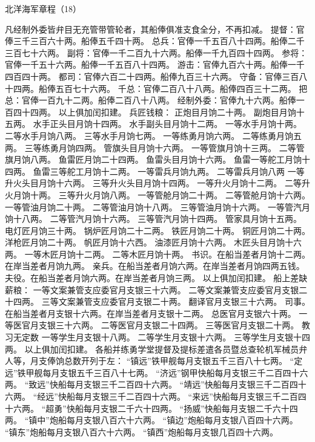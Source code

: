 \documentclass[12pt,UTF8]{ctexbook}
\begin{document}
北洋海军章程（18）

凡经制外委皆弁目无充管带管轮者，其船俸俱准支食全分，不再扣减。
提督：官俸三千三百六十两。船俸五千四十两。
总兵：官俸一千五百八十四两。船俸二千三百七十六两。
副将：官俸一千二百九十六两。船俸一千九百四十四两。
参将：官俸一千五十六两。船俸一千五百八十四两。
游击：官俸九百六十两。船俸一千四百四十两。
都司：官俸六百二十四两。船俸九百三十六两。
守备：官俸三百八十四两。船俸五百七十六两。
千总：官俸二百八十八两。船俸四百三十二两。
把总：官俸一百九十二两。船俸二百八十八两。
经制外委：官俸九十六两。船俸一百四十四两。
以上俱加闰扣建。
兵匠钱粮：
正炮目月饷二十两。
副炮目月饷十五两。
水手正头目月饷十四两。
水手副头目月饷十二两。
一等水手月饷十两。
二等水手月饷八两。
三等水手月饷七两。
一等练勇月饷六两。
二等练勇月饷五两。
三等练勇月饷四两。
管旗头目月饷十六两。
一等管旗月饷十三两。
二等管旗月饷八两。
鱼雷匠月饷二十四两。
鱼雷头目月饷十六两。
鱼雷一等舵工月饷十四两。
鱼雷三等舵工月饷十二两。
一等雷兵月饷九两。
二等雷兵月饷八两
一等升火头目月饷十六两。
三等升火头目月饷十四两。
一等升火月饷十二两。
二等升火月饷十两。
三等升火月饷八两。
一等管舱月饷二十两。
二等管舱月饷十六两。
一等管油月饷二十两。
二等管油月饷十八两。
三等管油月饷十六两。
一等管汽月饷十八两。
二等管汽月饷十六两。
三等管汽月饷十四两。
管家具月饷十五两。
电灯匠月饷三十两。
锅炉匠月饷二十二两。
铁匠月饷二十两。
铜匠月饷二十两。
洋枪匠月饷二十两。
帆匠月饷十六西。
油漆匠月饷十六两。
木匠头目月饷十六两。
一等木匠月饷十二两。
二等木匠月饷十两。
书识。在船当差者月饷十二两。在岸当差者月饷九两。
亲兵。在船当差者月饷六两。在岸当差者月饷四两五钱。
夫役。在船当差者月饷六两。在岸当差者月饷三两。
以上俱加闰扣建。
船上差缺薪粮：
一等文案兼管支应委官月支银三十六两。
二等文案兼管支应委官月支银二十四两。
三等文案兼管支应委官月支银二十两。
翻译官月支银三十六两。
司事。在船当差者月支银十六两。在岸当差者月支银十二两。
总医官月支银六十两。
一等医官月支银三十六两。
二等医官月支银二十四两。
三等医官月支银二十两。
教习无定数
一等学生月支银十八两。
二等学生月支银十六两。
三等学生月支银十四两。
以上俱加闰扣建。
各船并练勇学堂提督及提标差遣各员暨总查轮机军械员弁人等，月支俸饷总数开列于左：
“镇远”铁甲舰每月支银五千三百八十七两。
“定远”铁甲舰每月支银五千三百八十七两。
“济远”钢甲快船每月支银三千二百四十六两。
“致远”快船每月支银三千二百四十六两。
“靖远”快船每月支银三千二百四十六两。
“经远”快船每月支银三千二百四十六两。
“来远”快船每月支银三千二百四十六两。
“超勇”快船每月支银二千六十四两。
“扬威”快船每月支银二千六十四两。
“镇中”炮船每月支银八百六十六两。
“镇边”炮船每月支银八百四十六两。
“镇东”炮船每月支银八百六十六两。
“镇西”炮船每月支银几百四十六两。
\end{document}
